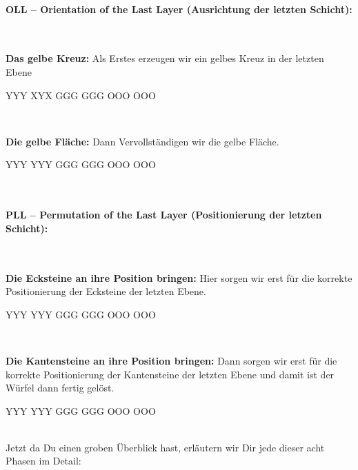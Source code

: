 \paragraph{OLL -- Orientation of the Last Layer (Ausrichtung der letzten Schicht):}\hfill\\[1em]
\parbox{0.7\linewidth}{
  \textbf{Das gelbe Kreuz:} Als Erstes erzeugen wir ein gelbes Kreuz in der letzten Ebene
}\parbox{0.3\linewidth}{
\centering
\RubikCubeGreyAll%
            {Y}{Y}{Y}
            {X}{Y}{X}%
	       {G}{G}{G}
	       {G}{G}{G}%
	       {O}{O}{O}
	       {O}{O}{O}%
}\\[1em]
\parbox{0.7\linewidth}{
  \textbf{Die gelbe Fläche:} Dann Vervollständigen wir die gelbe Fläche.
}\parbox{0.3\linewidth}{
\centering
\RubikCubeGreyAll%
            {Y}{Y}{Y}
            {Y}{Y}{Y}%
	       {G}{G}{G}
	       {G}{G}{G}%
	       {O}{O}{O}
	       {O}{O}{O}%
}\\[1em]
\paragraph{PLL -- Permutation of the Last Layer (Positionierung der letzten Schicht):}\hfill\\[1em]
\parbox{0.7\linewidth}{
  \textbf{Die Ecksteine an ihre Position bringen:} Hier sorgen wir erst für die korrekte Positionierung der Ecksteine der letzten Ebene.
}\parbox{0.3\linewidth}{
\centering
\RubikCubeGreyAll%
            {Y}{Y}{Y}
            {Y}{Y}{Y}%
	       {G}{G}{G}
	       {G}{G}{G}%
	       {O}{O}{O}
	       {O}{O}{O}%
}\\[1em]
\parbox{0.7\linewidth}{
  \textbf{Die Kantensteine an ihre Position bringen:} Dann sorgen wir erst für die korrekte Positionierung der Kantensteine der letzten Ebene und damit ist der Würfel dann fertig gelöst.
}\parbox{0.3\linewidth}{
\centering
\RubikCubeGreyAll%
            {Y}{Y}{Y}
            {Y}{Y}{Y}%
	       {G}{G}{G}
	       {G}{G}{G}%
	       {O}{O}{O}
	       {O}{O}{O}%
}\\[1em]


Jetzt da Du einen groben Überblick hast, erläutern wir Dir jede dieser acht Phasen im Detail:
